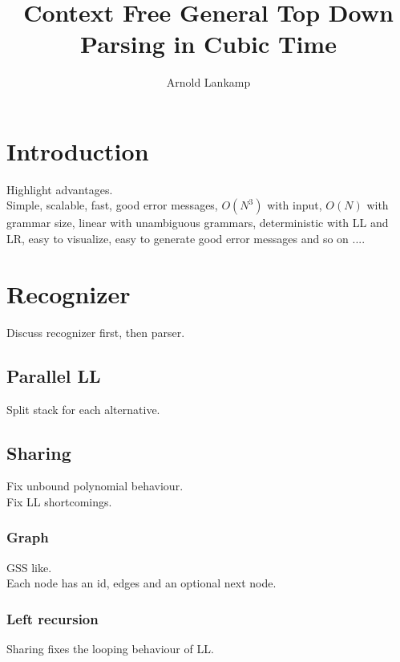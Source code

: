 \documentclass[a4paper,10pt]{article}
\title{Context Free General Top Down Parsing in Cubic Time}
\author{Arnold Lankamp}
\begin{document}
\maketitle

\begin{abstract}

\end{abstract}

\section{Introduction}

Highlight advantages.\\
Simple, scalable, fast, good error messages, $O(N^3)$ with input, $O(N)$ with grammar size, linear with unambiguous grammars, deterministic with LL and LR, easy to visualize, easy to generate good error messages and so on ....

\section{Recognizer}

Discuss recognizer first, then parser.

\subsection{Parallel LL}

Split stack for each alternative.

\subsection{Sharing}

Fix unbound polynomial behaviour.\\
Fix LL shortcomings.

\subsubsection{Graph}

GSS like.\\
Each node has an id, edges and an optional next node.

\subsubsection{Left recursion}

Sharing fixes the looping behaviour of LL.
\end{document}
